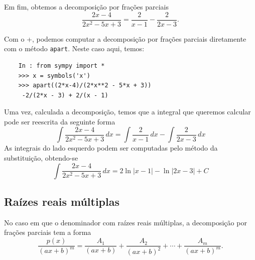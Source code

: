 \begin{ex}
  Em fim, obtemos a decomposição por frações parciais
  \begin{equation}
    \frac{2x-4}{2x^2 - 5x + 3} = \frac{2}{x-1} - \frac{2}{2x-3}.
  \end{equation}

  \ifispython
  Com o {\python}+{\sympy}, podemos computar a decomposição por frações parciais diretamente com o método \lstinline+apart+. Neste caso aqui, temos:
  \begin{lstlisting}
    In : from sympy import *
    >>> x = symbols('x')
    >>> apart((2*x-4)/(2*x**2 - 5*x + 3))
     -2/(2*x - 3) + 2/(x - 1)
  \end{lstlisting}
  \fi

  Uma vez, calculada a decomposição, temos que a integral que queremos calcular pode ser reescrita da seguinte forma
  \begin{equation}
    \int\frac{2x-4}{2x^2 - 5x + 3}\,dx = \int\frac{2}{x-1}\,dx - \int\frac{2}{2x-3}\,dx
  \end{equation}
  As integrais do lado esquerdo podem ser computadas pelo método da substituição, obtendo-se
  \begin{equation}
    \int\frac{2x-4}{2x^2 - 5x + 3}\,dx = 2\ln|x-1| - \ln|2x-3| + C
  \end{equation}
\end{ex}

\subsection{Raízes reais múltiplas}

No caso em que o denominador com raízes reais múltiplas, a decomposição por frações parciais tem a forma
\begin{equation}
  \frac{p(x)}{(ax+b)^m} = \frac{A_1}{(ax+b)} + \frac{A_2}{(ax+b)^2} + \cdots + \frac{A_m}{(ax+b)^m}. 
\end{equation}

